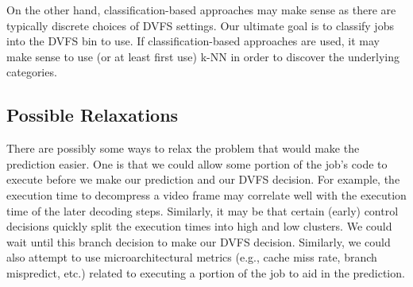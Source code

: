 \documentclass[11pt, letterpaper]{article}
\begin{document}
On the other hand, classification-based approaches may make sense as there are
typically discrete choices of DVFS settings. Our ultimate goal is to classify
jobs into the DVFS bin to use. If classification-based approaches are used, it
may make sense to use (or at least first use) k-NN in order to discover the
underlying categories.

\subsection{Possible Relaxations}

There are possibly some ways to relax the problem that would make the
prediction easier. One is that we could allow some portion of the job's code to
execute before we make our prediction and our DVFS decision. For example, the
execution time to decompress a video frame may correlate well with the
execution time of the later decoding steps. Similarly, it may be that certain
(early) control decisions quickly split the execution times into high and low
clusters. We could wait until this branch decision to make our DVFS decision.
Similarly, we could also attempt to use microarchitectural metrics (e.g., cache
miss rate, branch mispredict, etc.) related to executing a portion of the job
to aid in the prediction.

\end{document}
